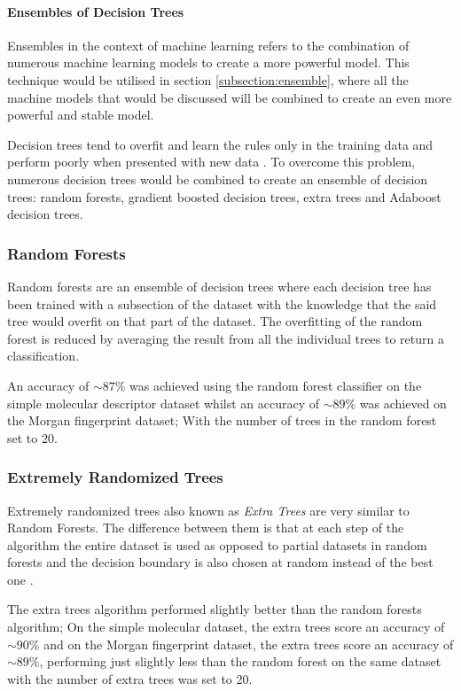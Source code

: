 \documentclass[a4paper,12pt]{report}
\begin{document}
			\paragraph{Ensembles of Decision Trees}
			Ensembles in the context of machine learning refers to the combination of numerous machine learning models to create a more powerful model. This technique would be utilised in section \ref{subsection:ensemble}, where all the machine models that would be discussed will be combined to create an even more powerful and stable model.
			
			Decision trees tend to overfit and learn the rules only in the training data and perform poorly when presented with new data \cite{Mueller2016}. To overcome this problem, numerous decision trees would be combined to create an ensemble of decision trees: random forests, gradient boosted decision trees, extra trees and Adaboost decision trees.
			\subsubsection{Random Forests}
			Random forests are an ensemble of decision trees where each decision tree has been trained with a subsection of the dataset with the knowledge that the said tree would overfit on that part of the dataset. The overfitting of the random forest is reduced by averaging the result from all the individual trees to return a classification.
			
			An accuracy of $\sim87\%$ was achieved using the random forest classifier on the simple molecular descriptor dataset whilst an accuracy of $\sim89\%$ was achieved on the Morgan fingerprint dataset; With the number of trees in the random forest set to 20.
				
			\subsubsection{Extremely Randomized Trees}
			Extremely randomized trees also known as \textit{Extra Trees} are very similar to Random Forests. The difference between them is that at each step of the algorithm the entire dataset is used as opposed to partial datasets in random forests and the decision boundary is also chosen at random instead of the best one \cite{Pierre2006}.
			
			The extra trees algorithm performed slightly better than the random forests algorithm; On the simple molecular dataset, the extra trees score an accuracy of $\sim90\%$ and on the Morgan fingerprint dataset, the extra trees score an accuracy of $\sim89\%$, performing just slightly less than the random forest on the same dataset with the number of extra trees was set to 20.
			
\end{document}
